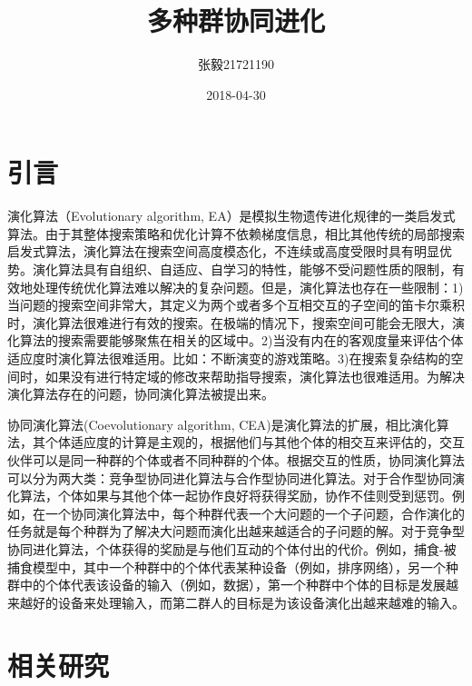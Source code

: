 \documentclass[a4paper]{article}
\title{多种群协同进化}
\date{2018-04-30}
\author{张毅\hspace{1em}21721190}
\begin{document}
    
    \maketitle


    \newpage
    \tableofcontents
    

    \newpage
    \section{引言}

    演化算法（Evolutionary algorithm, EA）是模拟生物遗传进化规律的一类启发式算法。由于其整体搜索策略和优化计算不依赖梯度信息，相比其他传统的局部搜索启发式算法，演化算法在搜索空间高度模态化，不连续或高度受限时具有明显优势。演化算法具有自组织、自适应、自学习的特性，能够不受问题性质的限制，有效地处理传统优化算法难以解决的复杂问题\cite{sun_ea}。但是，演化算法也存在一些限制：1)当问题的搜索空间非常大，其定义为两个或者多个互相交互的子空间的笛卡尔乘积时，演化算法很难进行有效的搜索。在极端的情况下，搜索空间可能会无限大，演化算法的搜索需要能够聚焦在相关的区域中。2)当没有内在的客观度量来评估个体适应度时演化算法很难适用。比如：不断演变的游戏策略。3)在搜索复杂结构的空间时，如果没有进行特定域的修改来帮助指导搜索，演化算法也很难适用。为解决演化算法存在的问题，协同演化算法被提出来。
    
    协同演化算法(Coevolutionary algorithm, CEA)是演化算法的扩展，相比演化算法，其个体适应度的计算是主观的，根据他们与其他个体的相交互来评估的，交互伙伴可以是同一种群的个体或者不同种群的个体\cite{wiegand2003analysis}。根据交互的性质，协同演化算法可以分为两大类：竞争型协同进化算法与合作型协同进化算法。对于合作型协同演化算法，个体如果与其他个体一起协作良好将获得奖励，协作不佳则受到惩罚。例如，在一个协同演化算法中，每个种群代表一个大问题的一个子问题，合作演化的任务就是每个种群为了解决大问题而演化出越来越适合的子问题的解。对于竞争型协同进化算法，个体获得的奖励是与他们互动的个体付出的代价。例如，捕食-被捕食模型中，其中一个种群中的个体代表某种设备（例如，排序网络），另一个种群中的个体代表该设备的输入（例如，数据），第一个种群中个体的目标是发展越来越好的设备来处理输入，而第二群人的目标是为该设备演化出越来越难的输入。


    \newpage
    \section{相关研究}
    
\end{document}
